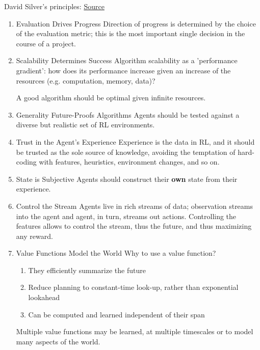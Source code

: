 \documentclass[12pt, english]{article}
\begin{document}
David Silver's principles:
\href{http://www.deeplearningindaba.com/uploads/1/0/2/6/102657286/principles_of_deep_rl.pdf}{Source}

\begin{enumerate}
  \item Evaluation Drives Progress
  Direction of progress is determined by the choice of the evaluation metric; this is the most important single decision in the course of a project.

  \item Scalability Determines Success
  Algorithm scalability as a 'performance gradient': how does its performance increase given an increase of the resources (e.g. computation, memory, data)?

  A good algorithm should be optimal given infinite resources.

  \item Generality Future-Proofs Algorithms
  Agents should be tested against a diverse but realistic set of RL environments.

  \item Trust in the Agent’s Experience
  Experience is the data in RL, and it should be trusted as the sole source of knowledge, avoiding the temptation of hard-coding with features, heuristics, environment changes, and so on.

  \item State is Subjective
  Agents should construct their \textbf{own} state from their experience.

  \item Control the Stream
  Agents live in rich streams of data; observation streams into the agent and agent, in turn, streams out actions.
  Controlling the features allows to control the stream, thus the future, and thus maximizing any reward.

  \item Value Functions Model the World
  Why to use a value function?
  \begin{enumerate}
    \item They efficiently summarize the future
    \item Reduce planning to constant-time look-up, rather than exponential lookahead
    \item Can be computed and learned independent of their span
  \end{enumerate}

  Multiple value functions may be learned, at multiple timescales or to model many aspects of the world.


\end{enumerate}
\end{document}
